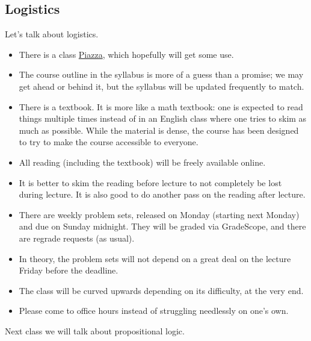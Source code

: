 \subsection{Logistics}
Let's talk about logistics.
\begin{itemize}
	\item There is a class \href{https://piazza.com/class/ky91rs7rzr02bc}{Piazza}, which hopefully will get some use.
	\item The course outline in the syllabus is more of a guess than a promise; we may get ahead or behind it, but the syllabus will be updated frequently to match.
	\item There is a textbook. It is more like a math textbook: one is expected to read things multiple times instead of in an English class where one tries to skim as much as possible. While the material is dense, the course has been designed to try to make the course accessible to everyone.
	\item All reading (including the textbook) will be freely available online.
	\item It is better to skim the reading before lecture to not completely be lost during lecture. It is also good to do another pass on the reading after lecture.
	\item There are weekly problem sets, released on Monday (starting next Monday) and due on Sunday midnight. They will be graded via GradeScope, and there are regrade requests (as usual).
	\item In theory, the problem sets will not depend on a great deal on the lecture Friday before the deadline.
	\item The class will be curved upwards depending on its difficulty, at the very end.
	\item Please come to office hours instead of struggling needlessly on one's own.
\end{itemize}
Next class we will talk about propositional logic.